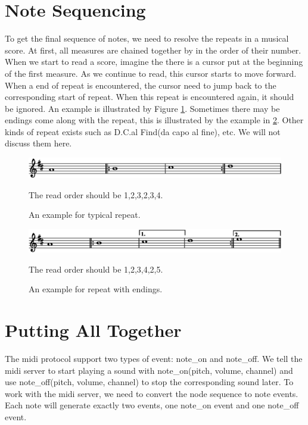 \section{Note Sequencing}
To get the final sequence of notes, we need to resolve the repeats in a musical score. At first,
all measures are chained together by in the order of their number. When we start to read a score, 
imagine the there is a cursor put at the beginning of the first measure. As we continue to read,
this cursor starts to move forward. When a end of repeat is encountered, the cursor need to jump back
to the corresponding start of repeat. When this repeat is encountered again, it should be ignored.
An example is illustrated by Figure \ref{fig:repeat-simple}. Sometimes there may be endings come along
with the repeat, this is illustrated by the example in \ref{fig:repeat-with-endings}. Other kinds of repeat
exists such as D.C.al Find(da capo al fine), etc. We will not discuss them here.

\begin{figure}[h]
    \centering
    \includegraphics[width=\textwidth]{Figures/repeat-simple.eps}
    \caption{An example for typical repeat.}
    \label{fig:repeat-simple}
    \startdescription
    The read order should be 1,2,3,2,3,4.
\end{figure}

\begin{figure}[h]
    \centering
    \includegraphics[width=\textwidth]{Figures/repeat-with-endings.eps}
    \caption{An example for repeat with endings.}
    \label{fig:repeat-with-endings}
    \startdescription
    The read order should be 1,2,3,4,2,5.
\end{figure}


\section{Putting All Together}
The midi protocol support two types of event: note\_on and note\_off. We tell the midi server to
start playing a sound with note\_on(pitch, volume, channel) and use note\_off(pitch, volume, channel) to stop
the corresponding sound later. To work with the midi server, we need to convert the node sequence to note events.
Each note will generate exactly two events, one note\_on event and one note\_off event.

